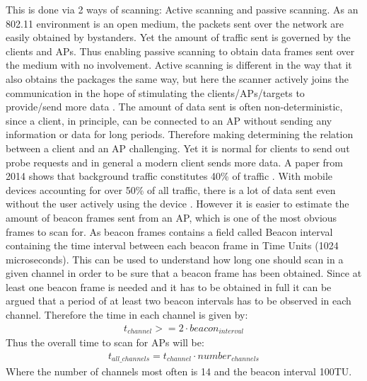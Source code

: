 This is done via 2 ways of scanning: Active scanning and passive scanning. 
As an 802.11 environment is an open medium, the packets sent over the network are easily obtained by bystanders. Yet the amount of traffic sent is governed by the clients and APs. Thus enabling passive scanning to obtain data frames sent over the medium with no involvement. Active scanning is different in the way that it also obtains the packages the same way, but here the scanner actively joins the communication in the hope of stimulating the clients/APs/targets to provide/send more data \cite{Mitre2}.
The amount of data sent is often non-deterministic, since a client, in principle, can be connected to an AP without sending any information or data for long periods. Therefore making determining the relation between a client and an AP challenging. Yet it is normal for clients to send out probe requests and in general a modern client sends more data. A paper from 2014 shows that background traffic constitutes 40\% of traffic \cite{utility}. With mobile devices accounting for over 50\% of all traffic, there is a lot of data sent even without the user actively using the device \cite{stats_mobile}.
However it is easier to estimate the amount of beacon frames sent from an AP, which is one of the most obvious frames to scan for. As beacon frames contains a field called Beacon interval containing the time interval between each beacon frame in Time Units (1024 microseconds). This can be used to understand how long one should scan in a given channel in order to be sure that a beacon frame has been obtained.
Since at least one beacon frame is needed and it has to be obtained in full it can be argued that a period of at least two beacon intervals has to be observed in each channel. Therefore the time in each channel is given by:
\begin{align}
    t_{channel} >= 2\cdot beacon_{interval}
    \label{tchannel}
\end{align}
Thus the overall time to scan for APs will be:
\begin{align}
    t_{all\_channels} = t_{channel}\cdot number_{channels}
    \label{tallchannels}
\end{align}
Where the number of channels most often is 14 and the beacon interval 100TU.

